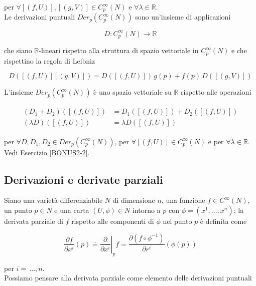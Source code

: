 per $ \forall [(f,U)], [(g,V)] \in C_{p}^{\infty}(N) $ e $ \forall \lambda \in \mathbb{R} $.\\
Le derivazioni puntuali $ Der_{p}(C_{p}^{\infty}(N)) $ sono un'insieme di applicazioni

\begin{equation}
	D : C_{p}^{\infty}(N) \to \mathbb{R}
\end{equation}

che siano $ \mathbb{R} $-lineari rispetto alla struttura di spazio vettoriale in $ C_{p}^{\infty}(N) $ e che rispettino la regola di Leibniz

\begin{equation}
	D([(f,U)] [(g,V)]) = D([(f,U)]) \, g(p) + f(p) \, D([(g,V)])
\end{equation}

L'insieme $ Der_{p}(C_{p}^{\infty}(N)) $ è uno spazio vettoriale su $ \mathbb{R} $ rispetto alle operazioni

\begin{align}
	\begin{split}
		(D_{1} + D_{2})([(f,U)]) &= D_{1}([(f,U)]) + D_{2}([(f,U)])\\
		(\lambda D)([(f,U)]) &= \lambda D([(f,U)])
	\end{split}
\end{align}

per $ \forall D,D_{1},D_{2} \in Der_{p}(C_{p}^{\infty}(N)) $, per $ \forall [(f,U)] \in C_{p}^{\infty}(N) $ e per $ \forall \lambda \in \mathbb{R} $.\\
Vedi Esercizio \ref{BONUS2-2}.

\subsection{Derivazioni e derivate parziali}

Siano una varietà differenziabile $ N $ di dimensione $ n $, una funzione $ f \in C^{\infty}(N) $, un punto $ p \in N $ e una carta $ (U, \phi) \in N $ intorno a $ p $ con $ \phi = (x^{1},\dots,x^{n}) $; la derivata parziale di $ f $ rispetto alle componenti di $ \phi $ nel punto $ p $ è definita come

\begin{equation}
	\dfrac{\partial f}{\partial x^{i}} (p) \doteq \left. \dfrac{\partial}{\partial x^{i}} \right|_{p} f = \dfrac{\partial (f \circ \phi^{-1})}{\partial r^{i}} (\phi(p))
\end{equation}

per $ i=\,\dots,n $.\\
Possiamo pensare alla derivata parziale come elemento delle derivazioni puntuali

